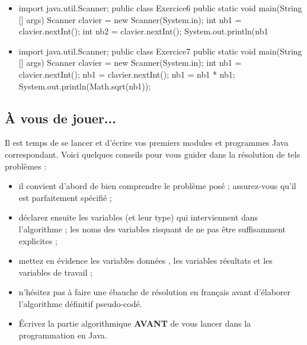 \documentclass[11pt,a4paper]{article}
\begin{document}
\begin{itemize}
			\item \begin{Java}
import java.util.Scanner;
public class Exercice6 {
    public static void main(String [] args) {
        Scanner clavier = new Scanner(System.in);
        int nb1 = clavier.nextInt();
        int nb2 = clavier.nextInt();
        System.out.println(nb1%
    }
}
        \end{Java} \textcolor{gray}{\underline{\hspace*{1em}}} 
			\item \begin{Java}
import java.util.Scanner;
public class Exercice7 {
    public static void main(String [] args) {
        Scanner clavier = new Scanner(System.in);
        int nb1 = clavier.nextInt();
        nb1 = clavier.nextInt();
        nb1 = nb1 * nb1;
        System.out.println(Math.sqrt(nb1));
    }
}
        \end{Java} \textcolor{gray}{\underline{\hspace*{1em}}} 
					\end{itemize}
				
            \par
        \subsection{\`A vous de jouer...}
          Il est temps de se lancer et d'\'ecrire vos premiers modules et programmes Java correspondant. 
          Voici quelques conseils pour vous guider dans la r\'esolution de tels probl\`emes :
          
					\begin{itemize}
				
			\item il convient d'abord de bien comprendre le probl\`eme pos\'e ; assurez-vous qu'il est parfaitement sp\'ecifi\'e ;
			\item d\'eclarez ensuite les variables (et leur type) qui interviennent dans l'algorithme ; les noms des variables risquant de ne pas \^etre suffisamment explicites ;
			\item mettez en \'evidence les variables \guillemotleft  donn\'ees \guillemotright , les variables \guillemotleft  r\'esultats \guillemotright  et les variables de travail ;
			\item n'h\'esitez pas \`a faire une \'ebauche de r\'esolution en fran\c cais avant d'\'elaborer l'algorithme d\'efinitif pseudo-cod\'e.
			\item \'Ecrivez la partie algorithmique \textbf{AVANT} de vous lancer dans la programmation en Java.
					\end{itemize}
				
\end{document}
